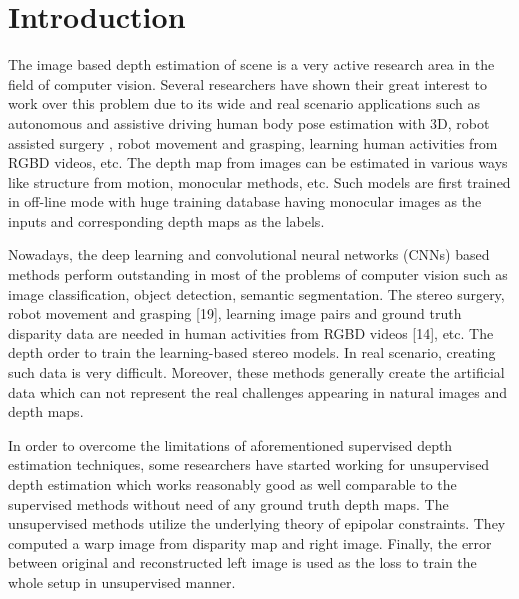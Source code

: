 \documentclass[10pt,twocolumn,letterpaper]{article}
\begin{document}
\section{Introduction}
The image based depth estimation of scene is a very active research area in the field of computer vision. Several researchers have shown their great interest to work over this problem due to its wide and real scenario applications\cite{Torralba2002Depth} such as autonomous and assistive driving human body pose estimation with 3D\cite{Shotton2013Real}, robot assisted surgery , robot movement and grasping, learning  human activities from RGBD videos, etc. The depth map from images can be estimated in various ways like structure from motion, monocular methods, etc. Such models are first trained in off-line mode with huge training database having monocular images as the inputs and corresponding depth maps as the labels.
\par
Nowadays, the deep learning and convolutional neural networks (CNNs) based methods perform outstanding in most of the problems of computer vision such as image classification, object detection, semantic segmentation. The stereo surgery, robot movement and grasping [19], learning image pairs and ground truth disparity data are needed in human activities from RGBD videos [14], etc. The depth order to train the learning-based stereo models. In real scenario, creating such data is very difficult. Moreover, these methods generally create the artificial data which can not represent the real challenges appearing in natural images and depth maps.
\par
In order to overcome the limitations of aforementioned supervised depth estimation techniques, some researchers have started working for unsupervised depth estimation which works reasonably good as well comparable to the supervised methods without need of any ground truth depth maps. The unsupervised methods utilize the underlying theory of epipolar constraints\cite{Kuznietsov2017Semi}. They computed a warp image from disparity map and right image. Finally, the error between original and reconstructed left image is used as the loss to train the whole setup in unsupervised manner.
\end{document}
